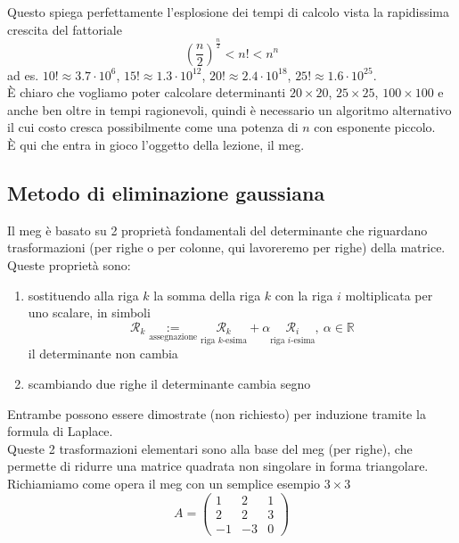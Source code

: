 \documentclass[12pt,a4paper]{article}
\begin{document}
Questo spiega perfettamente l'esplosione dei tempi di calcolo vista la rapidissima crescita del fattoriale
\begin{equation*}
    \left( \frac{n}{2} \right)^ {\frac{n}{2}} < n! < n^n
\end{equation*}
ad es. $10! \approx 3.7 \cdot 10^6$, $15! \approx 1.3 \cdot 10^{12}$, $20! \approx 2.4 \cdot 10^{18}$, $25! \approx 1.6 \cdot 10^{25}$.\\
È chiaro che vogliamo poter calcolare determinanti $20 \times 20$, $25 \times 25$, $100 \times 100$ e anche ben oltre in tempi ragionevoli, quindi è necessario un algoritmo alternativo il cui costo cresca possibilmente come una potenza di $n$ con esponente piccolo. \\
È qui che entra in gioco l'oggetto della lezione, il meg.

\subsection{Metodo di eliminazione gaussiana}
Il meg è basato su 2 proprietà fondamentali del determinante che riguardano trasformazioni (per righe o per colonne, qui lavoreremo per righe) della matrice. \\
Queste proprietà sono:
\begin{enumerate}
    \item sostituendo alla riga $k$ la somma della riga $k$ con la riga $i$ moltiplicata per uno scalare, in simboli
    \begin{equation*}
        \mathcal{R}_k \underset{\text{assegnazione}}{:=} \underset{\text{riga $k$-esima}}{\mathcal{R}_k} + \alpha \underset{\text{riga $i$-esima}}{\mathcal{R}_i}, \ \alpha \in \mathbb{R}
    \end{equation*}
    il determinante non cambia
    \item scambiando due righe il determinante cambia segno
\end{enumerate}
Entrambe possono essere dimostrate (non richiesto) per induzione tramite la formula di Laplace.\\
Queste 2 trasformazioni elementari sono alla base del meg (per righe), che permette di ridurre una matrice quadrata non singolare in forma triangolare.\\
Richiamiamo come opera il meg con un semplice esempio $3 \times 3$
\begin{equation*}
    A=\begin{pmatrix}
       1 & 2 & 1 \\
       2 & 2 & 3 \\
       -1 & -3 & 0
    \end{pmatrix}
\end{equation*}
\end{document}
